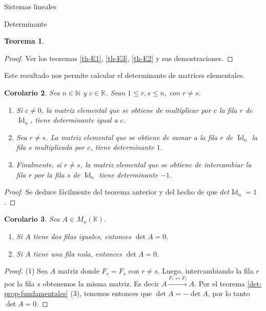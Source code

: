 \documentclass[a4paper,12pt,twoside,spanish,reqno]{amsbook}
\newtheorem{teorema}{Teorema}[section]
\newtheorem{corolario}[teorema]{Corolario}
\theoremstyle{definition}
\theoremstyle{remark}
\newcommand{\Id}{\operatorname{Id}}
\newcommand{\K}{\mathbb K}
\begin{document}
\begin{chapter}{Sistemas lineales}
\begin{section}{Determinante}
\begin{teorema}
\begin{enumerate}
        \end{enumerate}
    \end{teorema}
    \begin{proof}
        Ver  los teoremas \ref{th-E1}, \ref{th-E3}, \ref{th-E2} y  sus demostraciones.
    \end{proof}

    
    
    Este resultado nos permite calcular el determinante de matrices elementales.
    
    
    
    
    \begin{corolario}\label{det-mtrx-elem} Sea $n \in \mathbb N$ y $c \in \K$. Sean $1 \le r,s \le n$,  con $r \ne s$.
        \begin{enumerate}
            \item Si $c \not=0$, la matriz elemental que se obtiene de multiplicar por  $c$ la fila $r$ de $\Id_n$, tiene determinante igual a $c$.
            \item Sea $r \ne s$. La matriz elemental que se obtiene de sumar a la fila $r$ de $\Id_n$  la fila $s$ multiplicada por $c$, tiene determinante $1$.
            \item Finalmente, si $r \ne s$, la matriz elemental que se obtiene de intercambiar la fila $r$ por la fila $s$ de $\Id_n$ tiene determinante $-1$.
        \end{enumerate}	
    \end{corolario} 
    \begin{proof}
        Se deduce fácilmente del teorema anterior y del hecho de que $det \Id_n =1$.			
    \end{proof}
    
    
    \begin{corolario}\label{det-filas-iguales} Sea $A  \in M_n(\K)$.
        \begin{enumerate}
            \item Si $A$ tiene dos filas iguales,  entonces $\det A=0$.
            \item Si $A$ tiene una fila nula, entonces $\det A =0$.
        \end{enumerate}
    \end{corolario}
    \begin{proof}
        (1) Sea $A$ matriz donde $F_r = F_s$ con $r\ne s$. Luego, intercambiando la fila $r$ por la fila $s$ obtenemos la misma matriz. Es decir $A  \stackrel{F_r \leftrightarrow F_s}{\longrightarrow} A$. Por el teorema \ref{det-prop-fundamentales} (3), tenemos entonces que $\det A = - \det A$, por lo tanto  $\det A =0$. 
        

\end{proof}
\end{section}
\end{chapter}
\end{document}
